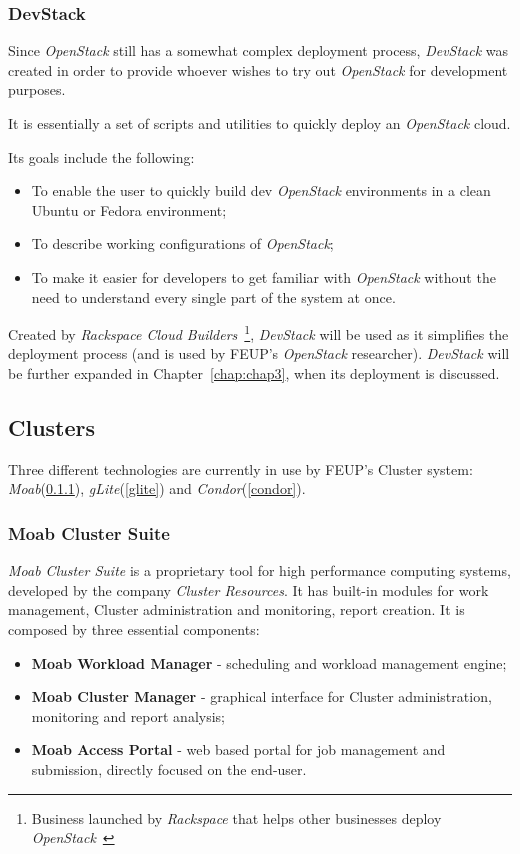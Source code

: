 \subsubsection{DevStack}\label{subsubsec:devstack}

Since \textit{OpenStack} still has a somewhat complex deployment process, \textit{DevStack} was created in order to provide whoever wishes to try out \textit{OpenStack} for development purposes.

It is essentially a set of scripts and utilities to quickly deploy an \textit{OpenStack} cloud.

Its goals include the following:
\begin{itemize}
\item To enable the user to quickly build dev \textit{OpenStack} environments in a clean Ubuntu or Fedora environment;
\item To describe working configurations of \textit{OpenStack};
\item To make it easier for developers to get familiar with \textit{OpenStack} without the need to understand every single part of the system at once.
\end{itemize}


Created by \textit{Rackspace Cloud Builders}~\footnote{Business launched by \textit{Rackspace} that helps other businesses deploy \textit{OpenStack}~\cite{http://www.rackspace.com/cloud/private_edition/}}, \textit{DevStack} will be used as it simplifies the deployment process (and is used by FEUP's \textit{OpenStack} researcher). \textit{DevStack} will be further expanded in Chapter~\ref{chap:chap3}, when its deployment is discussed.

\subsection{Clusters}\label{clusters}

Three different technologies are currently in use by FEUP's Cluster system: \textit{Moab}(\ref{moab}), \textit{gLite}(\ref{glite}) and \textit{Condor}(\ref{condor}).

\subsubsection{Moab Cluster Suite}\label{moab}

\textit{Moab Cluster Suite} is a proprietary tool for high performance computing systems, developed by the company \textit{Cluster Resources}. It has built-in modules for work management, Cluster administration and monitoring, report creation. It is composed by three essential components:
\begin{itemize}
\item \textbf{Moab Workload Manager} - scheduling and workload management engine;
\item \textbf{Moab Cluster Manager} - graphical interface for Cluster administration, monitoring and report analysis;
\item \textbf{Moab Access Portal} - web based portal for job management and submission, directly focused on the end-user.
\end{itemize}

